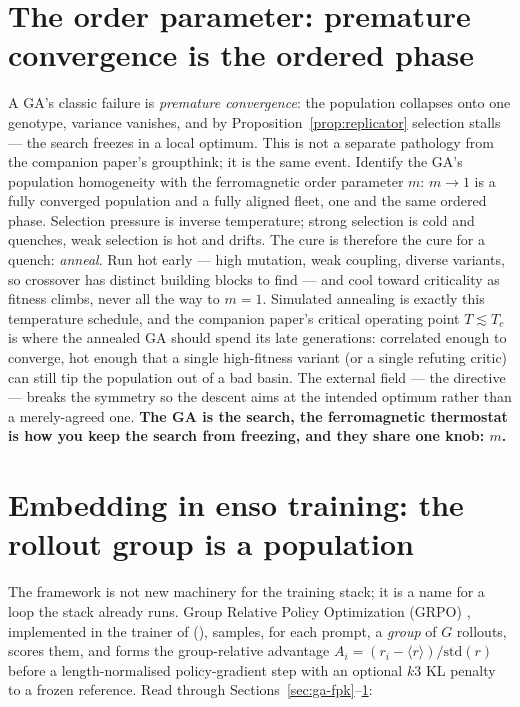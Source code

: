 \documentclass[11pt]{article}
\newcommand{\avg}[1]{\langle #1 \rangle}
\begin{document}
\section{The order parameter: premature convergence is the ordered phase}
\label{sec:order}

A GA's classic failure is \emph{premature convergence}: the population collapses onto one genotype, variance
vanishes, and by Proposition~\ref{prop:replicator} selection stalls --- the search freezes in a local optimum.
This is not a separate pathology from the companion paper's groupthink; it is the same event. Identify the
GA's population homogeneity with the ferromagnetic order parameter $m$: $m\to 1$ is a fully converged
population and a fully aligned fleet, one and the same ordered phase. Selection pressure is inverse
temperature; strong selection is cold and quenches, weak selection is hot and drifts. The cure is therefore
the cure for a quench: \emph{anneal}. Run hot early --- high mutation, weak coupling, diverse variants, so
crossover has distinct building blocks to find --- and cool toward criticality as fitness climbs, never all
the way to $m=1$. Simulated annealing \cite{kirkpatrick1983} is exactly this temperature schedule, and the companion paper's
critical operating point $T\lesssim T_c$ is where the annealed GA should spend its late generations:
correlated enough to converge, hot enough that a single high-fitness variant (or a single refuting critic) can
still tip the population out of a bad basin. The external field --- the directive --- breaks the symmetry so
the descent aims at the intended optimum rather than a merely-agreed one. \textbf{The GA is the search, the
ferromagnetic thermostat is how you keep the search from freezing, and they share one knob: $m$.}

\section{Embedding in enso training: the rollout group is a population}
\label{sec:enso}

The framework is not new machinery for the training stack; it is a name for a loop the stack already runs.
Group Relative Policy Optimization (GRPO) \cite{shao2024grpo}, implemented in the trainer of
\cite{hanzo-native-training} (), samples, for each
prompt, a \emph{group} of $G$ rollouts, scores them, and forms the group-relative advantage
$A_i=(r_i-\avg{r})/\mathrm{std}(r)$ before a length-normalised policy-gradient step with an optional $k3$ KL
penalty to a frozen reference. Read through Sections~\ref{sec:ga-fpk}--\ref{sec:order}:
\end{document}
